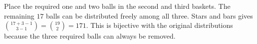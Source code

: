 Place the required one and two balls in the second and third baskets. The remaining $17$ balls can be distributed freely among all three. Stars and bars gives $\binom{17+3-1}{3-1}=\binom{19}2=\boxed{171}$. This is bijective with the original distributions because the three required balls can always be removed.
